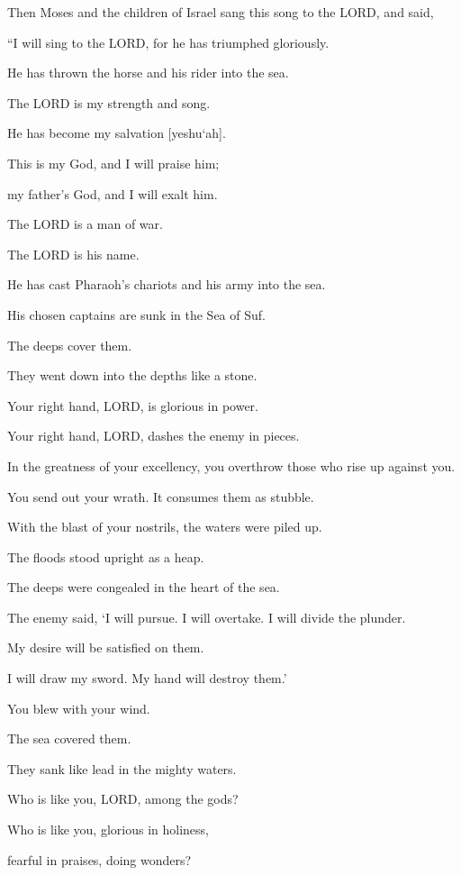 \mychapter{} \myverse*{}Then Moses and the children of Israel sang this song to the LORD, and said,

\quad\quad “I will sing to the LORD, for he has triumphed gloriously.

He has thrown the horse and his rider into the sea.


\myverse{}The LORD is my strength and song.

He has become my salvation [yeshu`ah].

This is my God, and I will praise him;

my father’s God, and I will exalt him.


\myverse{}The LORD is a man of war.

The LORD is his name.


\myverse{}He has cast Pharaoh’s chariots and his army into the sea.

His chosen captains are sunk in the Sea of Suf.


\myverse{}The deeps cover them.

They went down into the depths like a stone.


\myverse{}Your right hand, LORD, is glorious in power.

Your right hand, LORD, dashes the enemy in pieces.


\myverse{}In the greatness of your excellency, you overthrow those who
rise up against you.

You send out your wrath. It consumes them as stubble.


\myverse{}With the blast of your nostrils, the waters were piled up.

The floods stood upright as a heap.

The deeps were congealed in the heart of the sea.


\myverse{}The enemy said, ‘I will pursue. I will overtake. I will divide
the plunder.

My desire will be satisfied on them.

I will draw my sword. My hand will destroy them.’


\myverse{}You blew with your wind.

The sea covered them.

They sank like lead in the mighty waters.


\myverse{}Who is like you, LORD, among the gods?

Who is like you, glorious in holiness,

fearful in praises, doing wonders?


